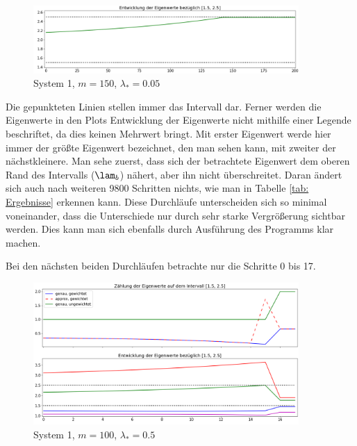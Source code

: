 \documentclass[a4paper,12pt]{report}
\newcommand{\zitat}[1]{\glqq #1\grqq}
\newcommand{\1}{\mathds{1}}
\theoremstyle{plain} %
\theoremstyle{definition} %
\theoremstyle{remark}
\begin{document}
            \begin{figure}[h!t]
                  \centering
                  \includegraphics[width=0.9\textwidth, keepaspectratio]{./Original/Plot_1_150_0.05.png}
                  \caption{System 1, $m=150$, $\lambda_*=0.05$}
                  \label{fig: Plot_1_150_0.05}
            \end{figure}

            Die gepunkteten Linien stellen immer das Intervall \lamAlamB dar.
            Ferner werden die Eigenwerte in den Plots \zitat{Entwicklung der Eigenwerte} nicht mithilfe einer Legende beschriftet, da dies keinen Mehrwert bringt.
            Mit erster Eigenwert werde hier immer der größte Eigenwert bezeichnet, den man sehen kann, mit zweiter der nächstkleinere.
            Man sehe zuerst, dass sich der betrachtete Eigenwert dem oberen Rand des Intervalls ($\lam_b$) nähert, aber ihn nicht überschreitet.
            Daran ändert sich auch nach weiteren 9800 Schritten nichts, wie man in Tabelle \ref{tab: Ergebnisse} erkennen kann.
            Diese Durchläufe unterscheiden sich so minimal voneinander, dass die Unterschiede nur durch sehr starke Vergrößerung sichtbar werden.
            Dies kann man sich ebenfalls durch Ausführung des Programms klar machen.

            Bei den nächsten beiden Durchläufen betrachte nur die Schritte 0 bis 17. 

            \begin{figure}[h!t]
                  \centering
                  \includegraphics[width=0.9\textwidth, keepaspectratio]{./Original/Plot_1_100_0.5.png}
                  \caption{System 1, $m=100$, $\lambda_*=0.5$}
                  \label{fig: Plot_1_100_0.5}
            \end{figure}
\end{document}
